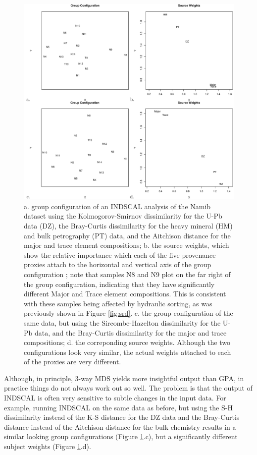 \documentclass{article}
\begin{document}
\begin{figure}
\centering
\includegraphics[width=\textwidth]{indscal.png}
\caption{a. group configuration of an INDSCAL analysis of the Namib
  dataset using the Kolmogorov-Smirnov dissimilarity for the U-Pb data
  (DZ), the Bray-Curtis dissimilarity for the heavy mineral (HM) and
  bulk petrography (PT) data, and the Aitchison distance for the major
  and trace element compositions; b. the source weights, which show
  the relative importance which each of the five provenance proxies
  attach to the horizontal and vertical axis of the group
  configuration \citep{vermeesch2015}; note that samples N8 and N9
  plot on the far right of the group configuration, indicating that
  they have significantly different Major and Trace element
  compositions. This is consistent with these samples being affected
  by hydraulic sorting, as was previously shown in Figure
  \ref{fig:srd}. c. the group configuration of the same data, but
  using the Sircombe-Hazelton dissimilarity for the U-Pb data, and the
  Bray-Curtis dissimilarity for the major and trace compositions;
  d. the correponding source weights. Although the two configurations
  look very similar, the actual weights attached to each of the
  proxies are very different.}
\label{fig:indscal}
\end{figure}

Although, in principle, 3-way MDS yields more insightful output than
GPA, in practice things do not always work out so well. The problem is
that the output of INDSCAL is often very sensitive to subtle changes
in the input data.  For example, running INDSCAL on the same data as
before, but using the S-H dissimilarity instead of the K-S distance
for the DZ data and the Bray-Curtis distance instead of the Aitchison
distance for the bulk chemistry results in a similar looking group
configurations (Figure \ref{fig:indscal}.c), but a significantly
different subject weights (Figure \ref{fig:indscal}.d).
\end{document}
